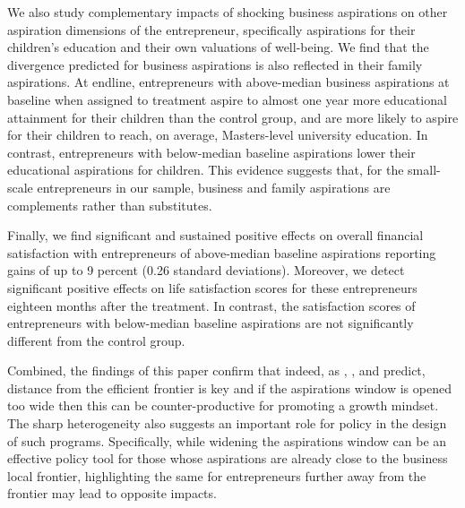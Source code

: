 \documentclass[11.5pt]{article}
\begin{document}
We also study complementary impacts of shocking business aspirations on other aspiration dimensions of the entrepreneur, specifically aspirations for their children's education and their own valuations of well-being. We find that the divergence predicted for business aspirations is also reflected in their family aspirations. At endline, entrepreneurs with above-median business aspirations at baseline when assigned to treatment aspire to almost one year more educational attainment for their children than the control group, and are more likely to aspire for their children to reach, on average, Masters-level university education. In contrast, entrepreneurs with below-median baseline aspirations lower their educational aspirations for children. This evidence suggests that, for the small-scale entrepreneurs in our sample, business and family aspirations are complements rather than substitutes.

Finally, we find significant and sustained positive effects on overall financial satisfaction with entrepreneurs of above-median baseline aspirations reporting gains of up to 9 percent (0.26 standard deviations). Moreover, we detect significant positive effects on life satisfaction scores for these entrepreneurs eighteen months after the treatment. In contrast, the satisfaction scores of entrepreneurs with below-median baseline aspirations are not significantly different from the control group.

Combined, the findings of this paper confirm that indeed, as \citet{Ray2006}, \citet{Dalton2016}, and \citet{Genicot2017} predict, distance from the efficient frontier is key and if the aspirations window is opened too wide then this can be counter-productive for promoting a growth mindset. The sharp heterogeneity also suggests an important role for policy in the design of such programs. Specifically, while widening the aspirations window can be an effective policy tool for those whose aspirations are already close to the business local frontier, highlighting the same for entrepreneurs further away from the frontier may lead to opposite impacts.
\end{document}
